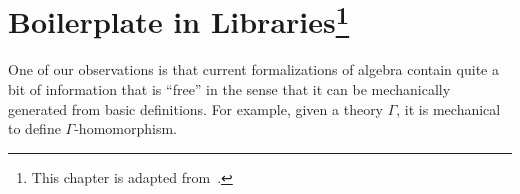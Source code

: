 \chapter[Boilerplate in Libraries]{Boilerplate in Libraries\footnote{This chapter is adapted from~\cite{leverageCICM2020}.}}
\label{ch:redundancy}

One of our observations is that current formalizations of algebra contain quite a
bit of information that is ``free'' in the sense that it can be
mechanically generated from basic definitions. For example, given a theory
$\Gamma$, it is mechanical to define $\Gamma$-homomorphism. 


